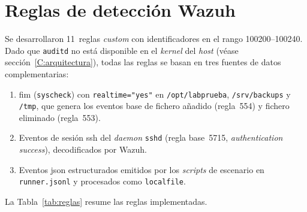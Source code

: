 \documentclass[../main.tex]{subfiles}
\begin{document}
\section{Reglas de detección Wazuh}
\label{sec:reglas}

Se desarrollaron 11~reglas \emph{custom} con identificadores en el rango
100200--100240. Dado que \texttt{auditd} no está disponible en el \emph{kernel}
del \emph{host} (véase sección~\ref{C:arquitectura}), todas las reglas se basan en
tres fuentes de datos complementarias:

\begin{enumerate}
  \item \gls{fim} (\texttt{syscheck}) con \texttt{realtime="yes"} en
  \texttt{/opt/labprueba}, \texttt{/srv/backups} y \texttt{/tmp}, que genera los
  eventos base de fichero añadido (regla~554) y fichero eliminado (regla~553).
  \item Eventos de sesión \gls{ssh} del \emph{daemon} \texttt{sshd}
  (regla base~5715, \emph{authentication success}), decodificados por Wazuh.
  \item Eventos \gls{json} estructurados emitidos por los \emph{scripts} de
  escenario en \texttt{runner.jsonl} y procesados como \texttt{localfile}.
\end{enumerate}

La Tabla~\ref{tab:reglas} resume las reglas implementadas.
\end{document}
